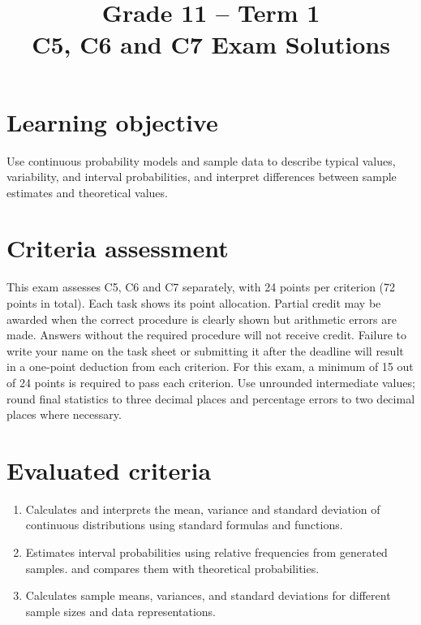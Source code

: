 \makeatletter
{}
\makeatother



\title{Grade 11 -- Term 1 \\ C5, C6 and C7 Exam Solutions}
\author{}
\date{}


\maketitle
\vspace{-2cm}
\setcounter{tocdepth}{1}
\setcounter{secnumdepth}{2}
\label{toc}
\tableofcontents

\section*{Learning objective}\vspace{-5mm}
Use continuous probability models and sample data to describe typical values,
variability, and interval probabilities, and interpret differences between
sample estimates and theoretical values.

\section*{Criteria assessment}\vspace{-5mm}
This exam assesses C5, C6 and C7 separately, with 24 points per criterion
(72 points in total). Each task shows its point allocation. Partial credit
may be awarded when the correct procedure is clearly shown but arithmetic
errors are made. Answers without the required procedure will not receive credit.
Failure to write your name on the task sheet or submitting it after the deadline
will result in a one-point deduction from each criterion.
For this exam, a minimum of 15 out of 24 points is required to pass each criterion.
Use unrounded intermediate values; round final statistics to three decimal
places and percentage errors to two decimal places where necessary.

\section*{Evaluated criteria}
\begin{enumerate}[label=\textbf{C\arabic*},start=5]
\item Calculates and interprets the mean, variance and standard deviation of continuous distributions using standard formulas and functions.
\item Estimates interval probabilities using relative frequencies from generated samples.
 and compares them with theoretical probabilities.
\item Calculates sample means, variances, and standard deviations for different sample sizes and data representations.
\end{enumerate}


